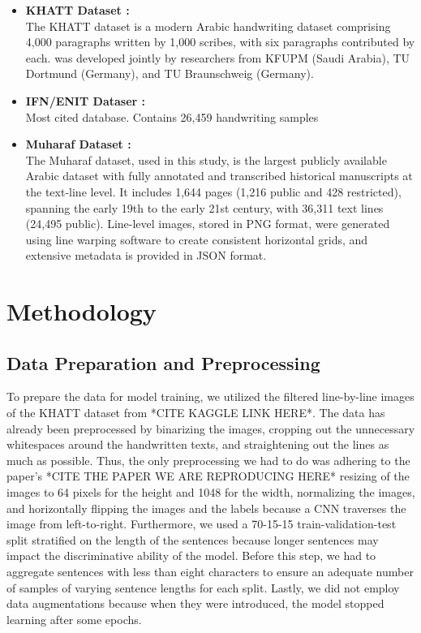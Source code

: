 \documentclass[conference]{IEEEtran}
\begin{document}
\begin{itemize}
  
    \item \textbf{KHATT Dataset \cite{mahmoud2014khatt}:} \\ 
    The KHATT dataset is a modern Arabic handwriting dataset comprising 4,000 paragraphs written by 1,000 scribes, with six paragraphs contributed by each.  was developed jointly by researchers from KFUPM (Saudi Arabia), TU Dortmund (Germany), and TU Braunschweig (Germany). 



    \item \textbf{IFN/ENIT Dataser \cite{mahmoud2014khatt}:} \\
    Most cited database. Contains 26,459 handwriting samples


    \item \textbf{Muharaf Dataset \cite{saeed2024muharaf}:} \\
    The Muharaf dataset, used in this study, is the largest publicly available Arabic dataset with fully annotated and transcribed historical manuscripts at the text-line level. It includes 1,644 pages (1,216 public and 428 restricted), spanning the early 19th to the early 21st century, with 36,311 text lines (24,495 public). Line-level images, stored in PNG format, were generated using line warping software to create consistent horizontal grids, and extensive metadata is provided in JSON format.
  
\end{itemize}


\section{Methodology}



\subsection{Data Preparation and Preprocessing}
To prepare the data for model training, we utilized the filtered line-by-line images of the KHATT dataset from *CITE KAGGLE LINK HERE*. The data has already been preprocessed by binarizing the images, cropping out the unnecessary whitespaces around the handwritten texts, and straightening out the lines as much as possible. Thus, the only preprocessing we had to do was adhering to the paper's *CITE THE PAPER WE ARE REPRODUCING HERE* resizing of the images to 64 pixels for the height and 1048 for the width, normalizing the images, and horizontally flipping the images and the labels because a CNN traverses the image from left-to-right. Furthermore, we used a 70-15-15 train-validation-test split stratified on the length of the sentences because longer sentences may impact the discriminative ability of the model. Before this step, we had to aggregate sentences with less than eight characters to ensure an adequate number of samples of varying sentence lengths for each split. Lastly, we did not employ data augmentations because when they were introduced, the model stopped learning after some epochs.
\end{document}
